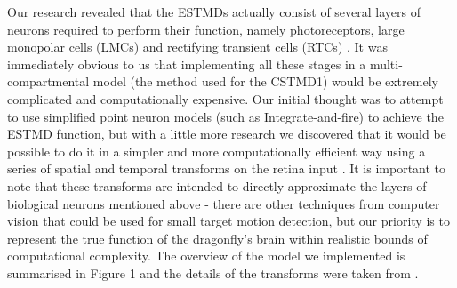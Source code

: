 \documentclass[a4paper,11pt]{article}
\begin{document}
	Our research revealed that the ESTMDs actually consist of several layers of neurons required to perform their function, namely photoreceptors, large monopolar cells (LMCs) and rectifying transient cells (RTCs) \cite{Wiederman2008}. It was immediately obvious to us that implementing all these stages in a multi-compartmental model (the method used for the CSTMD1) would be extremely complicated and computationally expensive. Our initial thought was to attempt to use simplified point neuron models (such as Integrate-and-fire) to achieve the ESTMD function, but with a little more research we discovered that it would be possible to do it in a simpler and more computationally efficient way using a series of spatial and temporal transforms on the retina input \cite{Wiederman2008} \cite{hal11}. It is important to note that these transforms are intended to directly approximate the layers of biological neurons mentioned above - there are other techniques from computer vision that could be used for small target motion detection, but our priority is to represent the true function of the dragonfly's brain within realistic bounds of computational complexity. The overview of the model we implemented is summarised in Figure 1 and the details of the transforms were taken from \cite{hal11}. 
\end{document}
